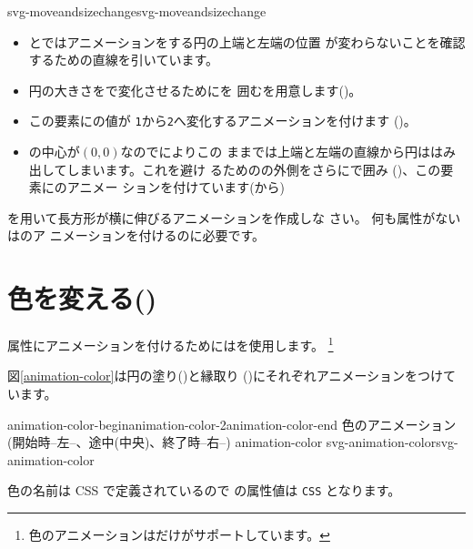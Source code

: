 {svg-moveandsizechange}{svg-moveandsizechange}
\begin{itemize}
 \item {}とではアニメーションをする円の上端と左端の位置
       が変わらないことを確認するための直線を引いています。
 \item 円の大きさをで変化させるためにを
       囲むを用意します()。
 \item この要素にの値が
       \texttt{1}から\texttt{2}へ変化するアニメーションを付けます
       ()。
 \item {}の中心が$(0,0)$なのでによりこの
       ままでは上端と左端の直線から円ははみ出してしまいます。これを避け
       るためのの外側をさらにで囲み
       ()、この要素にのアニメー
       ションを付けています(から)
\end{itemize}
{を用いて長方形が横に伸びるアニメーションを作成しな
 さい。}
{何も属性がない\noexpand{}は\noexpand{}のア
ニメーションを付けるのに必要です。}
\section{色を変える()}
属性にアニメーションを付けるためにはを使用します。
\footnote{色のアニメーションは\Opera だけがサポートしています。}

図\ref{animation-color}は円の塗り()と縁取り
()にそれぞれアニメーションをつけています。

{{animation-color-begin}{animation-color-2}{animation-color-end}}
{色のアニメーション(開始時--左--、途中(中央)、終了時--右--)}
{animation-color}
{svg-animation-color}{svg-animation-color}

色の名前は CSS で定義されているので  の属性値は
\texttt{CSS} となります。\vspace{-1.\baselineskip}
